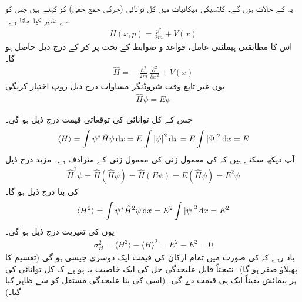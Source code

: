  \quad
یہ  کے حالات ہوں گے۔ کلاسیکی میکانیات میں کل توانائی (حرکی جمع خفی) کو  کہتے ہیں جس کو  سے ظاہر کیا جاتا ہے۔ 
\begin{align}
H(x,p) = \frac{p^{2}}{2m} + V(x)
\end{align}
اس کا مطابقتی ہیملٹنی عامل، قواعد و ضوابط کے تحت    پر کر کے درج ذیل حاصل ہو گا۔ 
\begin{align}
\hat{H} = - \frac{\hslash^{2}}{2m} \frac{\partial^{2}}{\partial x^{2}} + V(x) 
\end{align}
یوں غیر تابع وقت شروڈنگر مساوات  درج ذیل روپ اختیار کریگی 
\begin{align}
\hat{H} \psi = E\psi
\end{align}

جس کے کل توانائی کی توقعاتی قیمت درج ذیل ہو گی۔ 
\begin{align}
\langle H \rangle = \int \psi^{*} \hat{H}\psi \dif x = E \int \left| \psi \right|^{2} \dif x = E \int \left| \Psi \right|^{2} \dif x = E
\end{align}
آپ دیکھ سکتے ہیں کہ  کی معمول زنی  کی معمول زنی کے مترادف ہے۔ مزید درج ذیل 
\begin{align*}
\hat{H}^{2} \psi = \hat{H} (\hat{H}\psi ) = \hat{H} ( E\psi ) = E (\hat{H} \psi ) = E^{2} \psi 
\end{align*}
کی بنا درج ذیل ہو گا۔
\begin{align*}
\langle H^{2} \rangle = \int \psi^{*} \hat{H}^{2} \psi \dif x = E^{2} \int \left| \psi \right|^{2} \dif x = E^{2}
\end{align*}
یوں کی تغیریت درج ذیل ہو گی۔ 
\begin{align}
\sigma^{2}_{H} = \langle H^{2} \rangle - \langle H \rangle^{2} =E^{2} - E^{2} = 0
\end{align}
یاد رہے کہ    کی صورت میں تمام ارکان کی قیمت ایک دوسری جیسی ہو گی (تقسیم کا پھیلاؤ صفر ہو گا)۔ نتیجتاً قابل علیحدگی حل کی ایک خاصیت یہ ہو ہے کہ کل توانائی کی ہر پیمائش یقیناً ایک ہی قیمت  دے گی۔ (اسی کی بنا  علیحدگی مستقل کو  سے ظاہر کیا گیا۔) 

